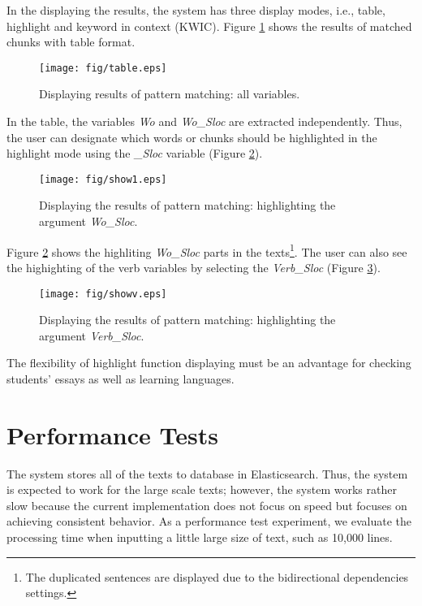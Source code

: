 \documentclass[conference]{IEEEtran}
\begin{document}
In the displaying the results, the system has three display modes, i.e.,
table, highlight and keyword in context (KWIC).
Figure \ref{fig:table} shows the results of matched chunks with table format.

\begin{figure}[htbp]
  \centerline{\texttt{[image: fig/table.eps]}}
  \caption{Displaying results of pattern matching: all variables.}
  \label{fig:table}
\end{figure}

In the table, the variables {\it Wo} and {\it Wo\_Sloc} are extracted
independently. Thus, the user can designate which words or chunks should be highlighted in
the highlight mode using the {\it \_Sloc} variable (Figure \ref{fig:show1}).

\begin{figure}[htbp]
  \centerline{\texttt{[image: fig/show1.eps]}}
  \caption{Displaying the results of pattern matching: highlighting the argument {\it Wo\_Sloc}.}
  \label{fig:show1}
\end{figure}

Figure \ref{fig:show1} shows the highliting {\it Wo\_Sloc} parts in the texts\footnote{The duplicated
  sentences are displayed due to the bidirectional dependencies settings.}.
The user can also see the highighting of the verb variables by selecting the {\it Verb\_Sloc} (Figure \ref{fig:showv}).

\begin{figure}[htbp]
  \centerline{\texttt{[image: fig/showv.eps]}}
  \caption{Displaying the results of pattern matching: highlighting the argument {\it Verb\_Sloc}.}
  \label{fig:showv}
\end{figure}

The flexibility of highlight function displaying must be an advantage for checking students' essays as well as
learning languages.

\section{Performance Tests}
\label{sec:experiment}
The system stores all of the texts to database in Elasticsearch. Thus,
the system is expected to work for the large scale texts; however, the
system works rather slow because the current implementation does not
focus on speed but focuses on achieving consistent behavior.  As a
performance test experiment, we evaluate the processing time when
inputting a little large size of text, such as 10,000 lines.
\end{document}
